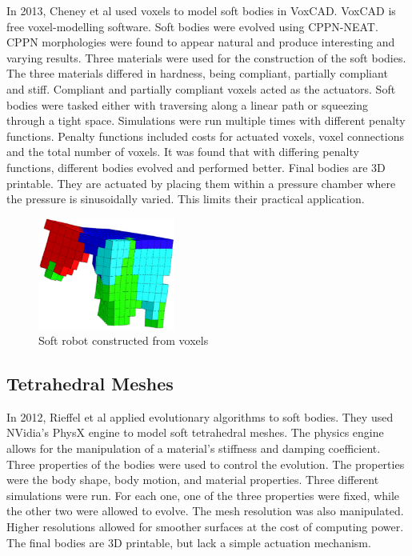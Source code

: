 In 2013, Cheney et al used voxels to model soft bodies in VoxCAD. VoxCAD is free voxel-modelling software. Soft bodies were evolved using CPPN-NEAT. CPPN morphologies were found to appear natural and produce interesting and varying results. Three materials were used for the construction of the soft bodies. The three materials differed in hardness, being compliant, partially compliant and stiff. Compliant and partially compliant voxels acted as the actuators. Soft bodies were tasked either with traversing along a linear path or squeezing through a tight space. Simulations were run multiple times with different penalty functions. Penalty functions included costs for actuated voxels, voxel connections and the total number of voxels. It was found that with differing penalty functions, different bodies evolved and performed better. Final bodies are 3D printable. They are actuated by placing them within a pressure chamber where the pressure is sinusoidally varied. This limits their practical application. \citep{Cheney2013,Cheney2015}

\begin{figure}[H]
	\centering
	\includegraphics[width=0.4\textwidth]{Voxel.png}
	\caption[Soft robot constructed from voxels]{Soft robot constructed from voxels \citep{Cheney2013}}
	\label{fig:vox}
\end{figure}

\subsection{Tetrahedral Meshes}

In 2012, Rieffel et al applied evolutionary algorithms to soft bodies. They used NVidia's PhysX engine to model soft tetrahedral meshes. The physics engine allows for the manipulation of a material's stiffness and damping coefficient. Three properties of the bodies were used to control the evolution. The properties were the body shape, body motion, and material properties. Three different simulations were run. For each one, one of the three properties were fixed, while the other two were allowed to evolve. The mesh resolution was also manipulated. Higher resolutions allowed for smoother surfaces at the cost of computing power. The final bodies are 3D printable, but lack a simple actuation mechanism. \citep{Rieffel2013}

